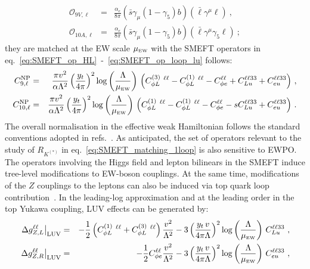 \begin{eqnarray}
	\label{eq:_Q9_Q10}
	\mathcal{O}_{9 V, \ell} & = & \frac{\alpha_{e}}{8 \pi} (\bar{s} \gamma_{\mu} (1-\gamma_{5})b) ( \bar{\ell} \gamma^{\mu} \ell ) \nonumber \ , \ \\
	\mathcal{O}_{10 A, \ell} & = & \frac{\alpha_{e}}{8 \pi} (\bar{s} \gamma_{\mu} (1-\gamma_{5})b) ( \bar{\ell} \gamma^{\mu} \gamma_{5} \ell ) \ ;
\end{eqnarray}
 they are matched at the EW scale $\mu_{\textrm{\tiny{EW}}}$  with the SMEFT operators in  eq.~\eqref{eq:SMEFT_op_HL}~-~\eqref{eq:SMEFT_op_loop_lu} follows:
\begin{eqnarray} 
	\label{eq:_C9_C10}
	C_{9,\ell}^{\rm NP}&=& \frac{\pi v^{2}}{\alpha \Lambda^2} \left(\frac{y_{t} }{4 \pi}\right)^2 \log \left( \frac{\Lambda}{\mu_{\textrm{\tiny{EW}}}} \right)   \, \left(C_{\phi L}^{(3)}\ ^{\ell \ell}-C_{\phi L}^{(1)}\ ^{\ell \ell}-C^{\ell \ell}_{\phi e}+ C_{Lu}^{\ell \ell 3 3} + C_{eu}^{\ell \ell 3 3} \right)\,,\nonumber \\
	C_{10,\ell}^{\rm NP}&=& \frac{\pi v^{2}}{\alpha \Lambda^2} \left(\frac{y_{t} }{4 \pi}\right)^2 \log \left( \frac{\Lambda}{\mu_{\textrm{\tiny{EW}}}} \right)   \, \left(C_{\phi L}^{(1)}\ ^{\ell \ell}-C_{\phi L}^{(1)}\ ^{\ell \ell}-C^{\ell \ell}_{\phi e}-s C_{Lu}^{\ell \ell 3 3} + C_{eu}^{\ell \ell 3 3} \right)\, .
\end{eqnarray} 
The overall normalisation in the effective weak Hamiltonian follows the standard conventions adopted in refs.~\cite{Ciuchini:2015qxb,Ciuchini:2017mik,Ciuchini:2019usw}.
As anticipated, the set of operators relevant to the study of $R_{K^{(*)}}$ in eq.~\eqref{eq:SMEFT_matching_1loop} is also sensitive to EWPO.  The operators involving the Higgs field and lepton bilinears in the SMEFT induce tree-level modifications to EW-boson couplings. At the same time, modifications of the $Z$ couplings to the leptons can also be induced via top quark loop
contribution~\cite{deBlas:2015aea}. In the leading-log approximation and at the leading order in the top Yukawa coupling, LUV effects can be generated by:
%
\begin{eqnarray}
	\label{eq:OLuedRGE}
	\left.\Delta g_{Z,L}^{\ell\ell}\right|_{\mathrm{LUV}} & = &
	- \frac 12 \left( C_{\phi L}^{(1)}\ ^{\ell \ell} +C_{\phi L}^{(3)}\ ^{\ell \ell} \right)\frac{v^2}{\Lambda^2}-
	3 \left( \frac{ y_t \, v}{4 \pi \Lambda} \right)^2 \log\left(\frac{\Lambda}{\mu_{\textrm{\tiny{EW}}}} \right) \, C_{Lu}^{\ell\ell33}  \ , \\ \nonumber
	\left.\Delta g_{Z,R}^{\ell\ell}\right|_{\mathrm{LUV}} & = & 
	- \frac 12 C^{\ell\ell}_{\phi e}\frac{v^2}{\Lambda^2}-
	3 \left( \frac{ y_t \, v}{4 \pi \Lambda} \right)^2 \log\left(\frac{\Lambda }{\mu_{\textrm{\tiny{EW}}}}\right) \, C_{eu}^{\ell\ell33} \ ,
\end{eqnarray}
